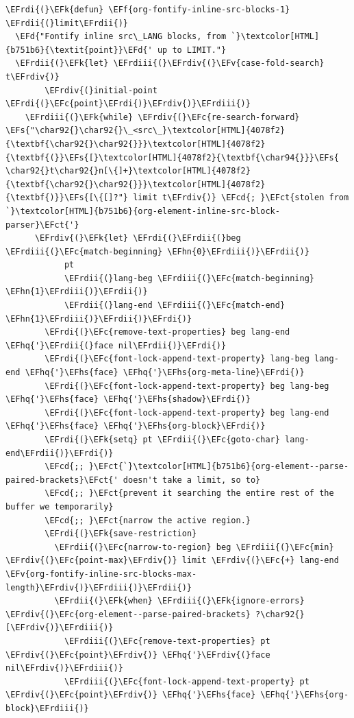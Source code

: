 \documentclass{scrartcl}
\newcommand{\EFk}[1]{\textcolor{EFk}{#1}} %
\newcommand{\EFd}[1]{\textcolor{EFd}{\textit{#1}}} %
\newcommand{\EFs}[1]{\textcolor{EFs}{#1}} %
\newcommand{\EFct}[1]{\textcolor{EFct}{#1}} %
\newcommand{\EFc}[1]{\textcolor{EFc}{#1}} %
\newcommand{\EFv}[1]{\textcolor{EFv}{#1}} %
\newcommand{\EFf}[1]{\textcolor{EFf}{#1}} %
\newcommand{\EFcd}[1]{\textcolor{EFcd}{#1}} %
\newcommand{\EFhn}[1]{\textcolor{EFhn}{\textbf{#1}}} %
\newcommand{\EFhq}[1]{\textcolor{EFhq}{#1}} %
\newcommand{\EFhs}[1]{\textcolor{EFhs}{#1}} %
\newcommand{\EFrdi}[1]{\textcolor{EFrdi}{#1}} %
\newcommand{\EFrdii}[1]{\textcolor{EFrdii}{#1}} %
\newcommand{\EFrdiii}[1]{\textcolor{EFrdiii}{#1}} %
\newcommand{\EFrdiv}[1]{\textcolor{EFrdiv}{#1}} %
\begin{document}
\begin{Code}
\begin{Verbatim}[]
\EFrdi{(}\EFk{defun} \EFf{org-fontify-inline-src-blocks-1} \EFrdii{(}limit\EFrdii{)}
  \EFd{"Fontify inline src\_LANG blocks, from `}\textcolor[HTML]{b751b6}{\textit{point}}\EFd{' up to LIMIT."}
  \EFrdii{(}\EFk{let} \EFrdiii{(}\EFrdiv{(}\EFv{case-fold-search} t\EFrdiv{)}
        \EFrdiv{(}initial-point \EFrdi{(}\EFc{point}\EFrdi{)}\EFrdiv{)}\EFrdiii{)}
    \EFrdiii{(}\EFk{while} \EFrdiv{(}\EFc{re-search-forward} \EFs{"\char92{}\char92{}\_<src\_}\textcolor[HTML]{4078f2}{\textbf{\char92{}\char92{}}}\textcolor[HTML]{4078f2}{\textbf{(}}\EFs{[}\textcolor[HTML]{4078f2}{\textbf{\char94{}}}\EFs{ \char92{}t\char92{}n[\{]+}\textcolor[HTML]{4078f2}{\textbf{\char92{}\char92{}}}\textcolor[HTML]{4078f2}{\textbf{)}}\EFs{[\{[]?"} limit t\EFrdiv{)} \EFcd{; }\EFct{stolen from `}\textcolor[HTML]{b751b6}{org-element-inline-src-block-parser}\EFct{'}
      \EFrdiv{(}\EFk{let} \EFrdi{(}\EFrdii{(}beg \EFrdiii{(}\EFc{match-beginning} \EFhn{0}\EFrdiii{)}\EFrdii{)}
            pt
            \EFrdii{(}lang-beg \EFrdiii{(}\EFc{match-beginning} \EFhn{1}\EFrdiii{)}\EFrdii{)}
            \EFrdii{(}lang-end \EFrdiii{(}\EFc{match-end} \EFhn{1}\EFrdiii{)}\EFrdii{)}\EFrdi{)}
        \EFrdi{(}\EFc{remove-text-properties} beg lang-end \EFhq{'}\EFrdii{(}face nil\EFrdii{)}\EFrdi{)}
        \EFrdi{(}\EFc{font-lock-append-text-property} lang-beg lang-end \EFhq{'}\EFhs{face} \EFhq{'}\EFhs{org-meta-line}\EFrdi{)}
        \EFrdi{(}\EFc{font-lock-append-text-property} beg lang-beg \EFhq{'}\EFhs{face} \EFhq{'}\EFhs{shadow}\EFrdi{)}
        \EFrdi{(}\EFc{font-lock-append-text-property} beg lang-end \EFhq{'}\EFhs{face} \EFhq{'}\EFhs{org-block}\EFrdi{)}
        \EFrdi{(}\EFk{setq} pt \EFrdii{(}\EFc{goto-char} lang-end\EFrdii{)}\EFrdi{)}
        \EFcd{;; }\EFct{`}\textcolor[HTML]{b751b6}{org-element--parse-paired-brackets}\EFct{' doesn't take a limit, so to}
        \EFcd{;; }\EFct{prevent it searching the entire rest of the buffer we temporarily}
        \EFcd{;; }\EFct{narrow the active region.}
        \EFrdi{(}\EFk{save-restriction}
          \EFrdii{(}\EFc{narrow-to-region} beg \EFrdiii{(}\EFc{min} \EFrdiv{(}\EFc{point-max}\EFrdiv{)} limit \EFrdiv{(}\EFc{+} lang-end \EFv{org-fontify-inline-src-blocks-max-length}\EFrdiv{)}\EFrdiii{)}\EFrdii{)}
          \EFrdii{(}\EFk{when} \EFrdiii{(}\EFk{ignore-errors} \EFrdiv{(}\EFc{org-element--parse-paired-brackets} ?\char92{}[\EFrdiv{)}\EFrdiii{)}
            \EFrdiii{(}\EFc{remove-text-properties} pt \EFrdiv{(}\EFc{point}\EFrdiv{)} \EFhq{'}\EFrdiv{(}face nil\EFrdiv{)}\EFrdiii{)}
            \EFrdiii{(}\EFc{font-lock-append-text-property} pt \EFrdiv{(}\EFc{point}\EFrdiv{)} \EFhq{'}\EFhs{face} \EFhq{'}\EFhs{org-block}\EFrdiii{)}

\end{Verbatim}
\end{Code}
\end{document}

